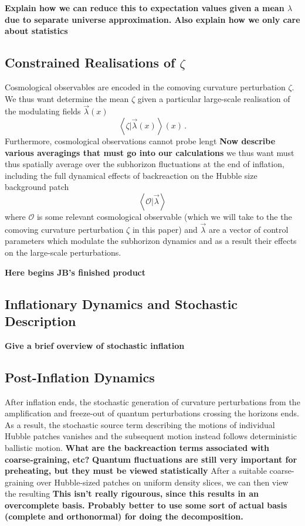 {\bf Explain how we can reduce this to expectation values given a mean $\lambda$ due to separate universe approximation.  Also explain how we only care about statistics}


\subsection{Constrained Realisations of $\zeta$}
Cosmological observables are encoded in the comoving curvature perturbation $\zeta$.
We thus want determine the mean $\zeta$ given a particular large-scale realisation of the modulating fields $\vec{\lambda}(x)$
\begin{equation}
  \left\langle \zeta | \vec{\lambda}(x)\right\rangle(x) \, .
\end{equation}
Furthermore, cosmological observations cannot probe lengt
{\bf Now describe various averagings that must go into our calculations}
we thus want  must thus spatially average over the subhorizon fluctuations at the end of inflation, including the full dynamical effects of backreaction on the Hubble size background patch
\begin{equation}
  \left\langle \mathcal{O}|\vec{\lambda} \right\rangle
\end{equation}
where $\mathcal{O}$ is some relevant cosmological observable (which we will take to the the comoving curvature perturbation $\zeta$ in this paper) and $\vec{\lambda}$ are a vector of control parameters which modulate the subhorizon dynamics and as a result their effects on the large-scale perturbations.


{\bf Here begins JB's finished product}
\subsection{Inflationary Dynamics and Stochastic Description}
{\bf Give a brief overview of stochastic inflation}
\subsection{Post-Inflation Dynamics}           
After inflation ends, the stochastic generation of curvature perturbations from the amplification and freeze-out of quantum perturbations crossing the horizons ends.
As a result, the stochastic source term describing the motions of individual Hubble patches vanishes and the subsequent motion instead follows deterministic ballistic motion.
{\bf What are the backreaction terms associated with coarse-graining, etc?}
{\bf Quantum fluctuations are still very important for preheating, but they must be viewed statistically}
After a suitable coarse-graining over Hubble-sized patches on uniform density slices, we can then view the resulting
{\bf This isn't really rigourous, since this results in an overcomplete basis.  Probably better to use some sort of actual basis (complete and orthonormal) for doing the decomposition.}
